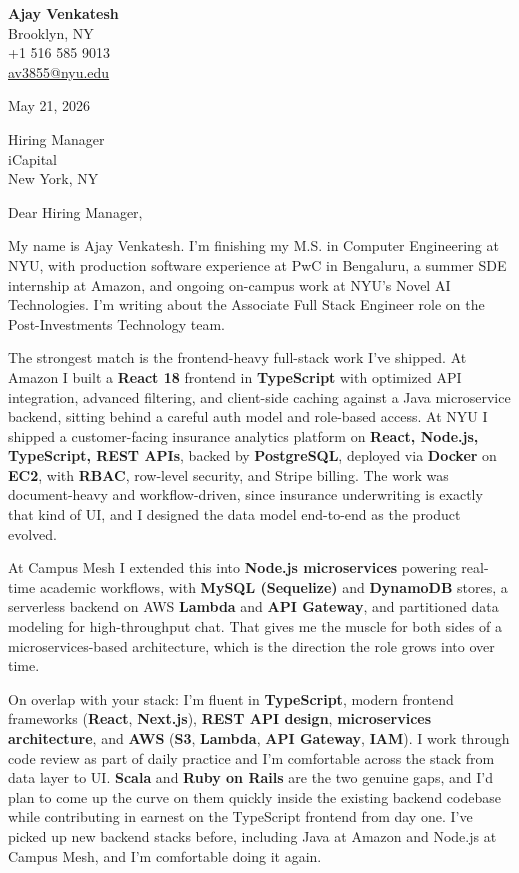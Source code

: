 \documentclass[letterpaper,11pt]{article}
\begin{document}
\begin{flushleft}
\textbf{\large Ajay Venkatesh} \\
Brooklyn, NY \\
+1 516 585 9013 \\
\href{mailto:av3855@nyu.edu}{av3855@nyu.edu}
\end{flushleft}
\vspace{10pt}
May 21, 2026
\vspace{6pt}

Hiring Manager \\
iCapital \\
New York, NY

\vspace{10pt}

Dear Hiring Manager,

My name is Ajay Venkatesh. I'm finishing my M.S. in Computer Engineering at NYU, with production software experience at PwC in Bengaluru, a summer SDE internship at Amazon, and ongoing on-campus work at NYU's Novel AI Technologies. I'm writing about the Associate Full Stack Engineer role on the Post-Investments Technology team.

The strongest match is the frontend-heavy full-stack work I've shipped. At Amazon I built a \textbf{React 18} frontend in \textbf{TypeScript} with optimized API integration, advanced filtering, and client-side caching against a Java microservice backend, sitting behind a careful auth model and role-based access. At NYU I shipped a customer-facing insurance analytics platform on \textbf{React, Node.js, TypeScript, REST APIs}, backed by \textbf{PostgreSQL}, deployed via \textbf{Docker} on \textbf{EC2}, with \textbf{RBAC}, row-level security, and Stripe billing. The work was document-heavy and workflow-driven, since insurance underwriting is exactly that kind of UI, and I designed the data model end-to-end as the product evolved.

At Campus Mesh I extended this into \textbf{Node.js microservices} powering real-time academic workflows, with \textbf{MySQL (Sequelize)} and \textbf{DynamoDB} stores, a serverless backend on AWS \textbf{Lambda} and \textbf{API Gateway}, and partitioned data modeling for high-throughput chat. That gives me the muscle for both sides of a microservices-based architecture, which is the direction the role grows into over time.

On overlap with your stack: I'm fluent in \textbf{TypeScript}, modern frontend frameworks (\textbf{React}, \textbf{Next.js}), \textbf{REST API design}, \textbf{microservices architecture}, and \textbf{AWS} (\textbf{S3}, \textbf{Lambda}, \textbf{API Gateway}, \textbf{IAM}). I work through code review as part of daily practice and I'm comfortable across the stack from data layer to UI. \textbf{Scala} and \textbf{Ruby on Rails} are the two genuine gaps, and I'd plan to come up the curve on them quickly inside the existing backend codebase while contributing in earnest on the TypeScript frontend from day one. I've picked up new backend stacks before, including Java at Amazon and Node.js at Campus Mesh, and I'm comfortable doing it again.
\end{document}
